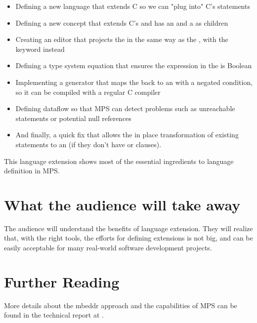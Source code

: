 \documentclass[10pt, conference, compsocconf]{IEEEtran}
\begin{document}
\begin{itemize}
  \item Defining a new language that extends C so we can "plug into" C's
  statements
  \item Defining a new concept  that extends C's
   and has an  and a  as children
  \item Creating an editor that projects the  in the same
  way as the , with the keyword  instead
  \item Defining a type system equation that ensures the expression in the
   is Boolean
  \item Implementing a generator that maps the  back to an 
  with a negated condition, so it can be compiled with a regular C compiler
  \item Defining dataflow so that MPS can detect problems such as unreachable statements or potential null references
  \item And finally, a quick fix that allows the in place transformation of
  existing  statements to an  (if they don't have  or  clauses).
\end{itemize}
This language extension shows most of the essential ingredients to language
definition in MPS.

\section{What the audience will take away}
The audience will understand the benefits of language extension. They will
realize that, with the right tools, the efforts for defining extensions is
not big, and can be easily acceptable for many real-world software development projects.

\section{Further Reading}
More details about the mbeddr approach and the capabilities of MPS can be found
in the technical report at .

%
\IEEEpeerreviewmaketitle
\end{document}
